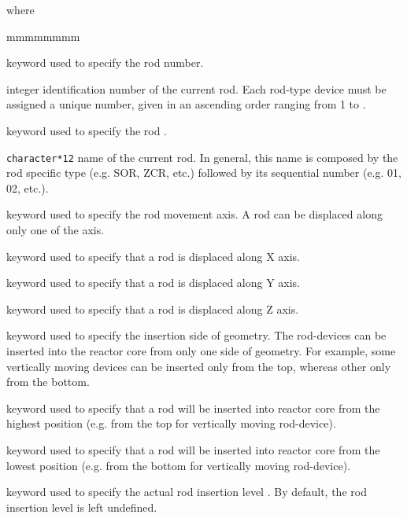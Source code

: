 \noindent where
\begin{ListeDeDescription}{mmmmmmmm}

\item[\moc{ROD}] keyword used to specify the rod  number.

\item[\dusa{id}] integer identification number of the current rod. Each
rod-type device must be assigned a unique  number, given in
an ascending order ranging from 1 to .

\item[\moc{ROD-NAME}] keyword used to specify the rod .

\item[\dusa{NAME}] \texttt{character*12} name of the current rod. In general,
this name is composed by the rod specific type (e.g. SOR, ZCR, etc.) followed
by its sequential number (e.g. 01, 02, etc.).

\item[\moc{AXIS}] keyword used to specify the rod movement axis.
A rod can be displaced along only one of the axis.

\item[\moc{X}] keyword used to specify that a rod is displaced along X axis.

\item[\moc{Y}] keyword used to specify that a rod is displaced along Y axis.

\item[\moc{Z}] keyword used to specify that a rod is displaced along Z axis.

\item[\moc{FROM}] keyword used to specify the insertion side of geometry.
The rod-devices can be inserted into the reactor core from only one side of
geometry. For example, some vertically moving devices can be inserted only
from the top, whereas other only from the bottom.

\item[\moc{H+}] keyword used to specify that a rod will be inserted into
reactor core from the highest position (e.g. from the top for vertically moving
rod-device).

\item[\moc{H-}] keyword used to specify that a rod will be inserted into
reactor core from the lowest position (e.g. from the bottom for vertically
moving rod-device).

\item[\moc{LEVEL}] keyword used to specify the actual rod insertion
level . By default, the rod insertion level is left undefined.


\end{ListeDeDescription}

